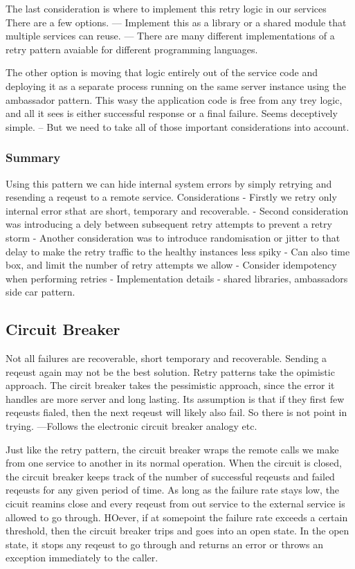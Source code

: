 \documentclass[a4paper, 11pt]{book}
\begin{document}
{    The last consideration is where to implement this retry logic in our services
    There are a few options.
    --- Implement this as a library or a shared module that multiple services can reuse.
    --- There are many different implementations of a retry pattern avaiable for different programming languages.

    The other option is moving that logic entirely out of the service code and deploying it as a separate process running on the same server instance using the ambassador pattern.
    This wasy the application code is free from any trey logic, and all it sees is either successful response or a final failure.
    Seems deceptively simple.
    -- But we need to take all of those important considerations into account.

    \subsubsection{Summary}
    Using this pattern we can hide internal system errors by simply retrying and resending a reqeust to a remote service.
    Considerations
    - Firstly we retry only internal error sthat are short, temporary and recoverable.
    - Second consideration was introducing a dely between subsequent retry attempts to prevent a retry storm
    - Another consideration was to introduce randomisation or jitter to that delay to make the retry traffic to the healthy instances less spiky
    - Can also time box, and limit the number of retry attempts we allow
    - Consider idempotency when performing retries
    - Implementation details - shared libraries, ambassadors side car pattern.

    \subsection{Circuit Breaker}
    Not all failures are recoverable, short temporary and recoverable. Sending a reqeust again may not be the best solution.
    Retry patterns take the opimistic approach.
    The circit breaker takes the pessimistic approach, since the error it handles are more server and long lasting.
    Its assumption is that if they first few reqeusts fialed, then the next reqeust will likely also fail.
    So there is not point in trying.
    ---Follows the electronic circuit breaker analogy etc.

    Just like the retry pattern, the circuit breaker wraps the remote calls we make from one service to another in its normal operation.
    When the circuit is closed, the circuit breaker keeps track of the number of successful reqeusts and failed reqeusts for any given period of time.
    As long as the failure rate stays low, the cicuit reamins close and every reqeust from out service to the external service is allowed to go through.
    HOever, if at somepoint the failure rate exceeds a certain threshold, then the circuit breaker trips and goes into an open state.
    In the open state, it stops any reqeust to go through and returns an error or throws an exception immediately to the caller.

}
\end{document}
